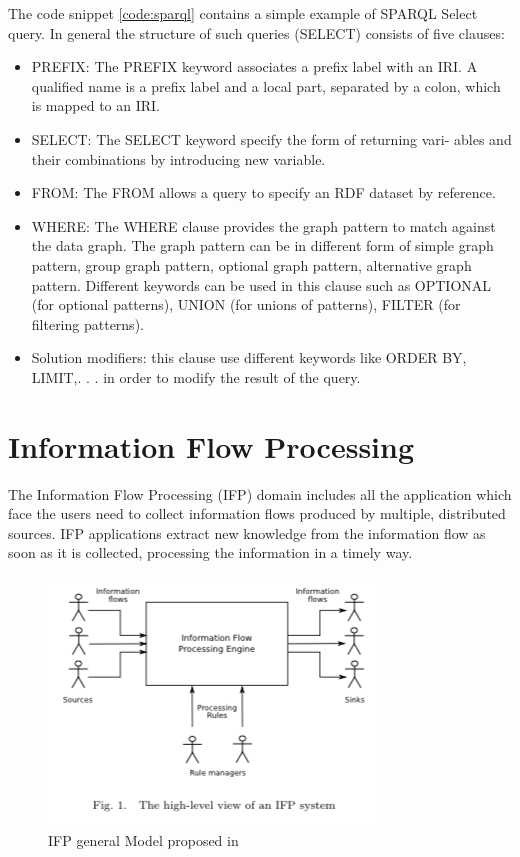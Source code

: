 The code snippet \ref{code:sparql} contains a simple example of SPARQL Select query. In general the structure of such queries (SELECT) consists of five clauses:
\begin{itemize}
\item PREFIX: The PREFIX keyword associates a prefix label with an IRI. A qualified name is a prefix label and a local part, separated by a colon, which is mapped to an IRI.
\item SELECT: The SELECT keyword specify the form of returning vari- ables and their combinations by introducing new variable.
\item FROM: The FROM allows a query to specify an RDF dataset by reference.
\item WHERE: The WHERE clause provides the graph pattern to match against the data graph. The graph pattern can be in different form of simple graph pattern, group graph pattern, optional graph pattern, alternative graph pattern. Different keywords can be used in this clause such as OPTIONAL (for optional patterns), UNION (for unions of patterns), FILTER (for filtering patterns).
\item Solution modifiers: this clause use different keywords like ORDER BY, LIMIT,. . . in order to modify the result of the query.
\end{itemize}


\section{Information Flow Processing}\label{sec:ifp}

The Information Flow Processing (IFP) domain includes all the application which face the users need to collect information  flows produced by multiple, distributed sources. IFP applications extract new knowledge from the information flow as soon as it is collected, processing the information in a timely way.

\begin{figure}[tbh]
  \centering
	\includegraphics[width=0.75\linewidth]{images/ifp}
	\caption{IFP general Model proposed in \cite{Cugola:2012:PFI:2187671.2187677}  } 
  	\label{fig:ifp}
\end{figure}


